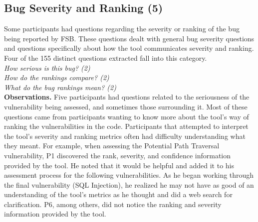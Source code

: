 \documentclass[conference]{IEEEtran}
\begin{document}




\noindent\subsection{\textbf{Bug Severity and Ranking (5)}}\label{bsr}

Some participants had questions regarding the severity or ranking of the bug being reported by FSB. 
These questions dealt with general bug severity questions and questions specifically about how the tool communicates severity and ranking. 
Four of the 155 distinct questions extracted fall into this category. 
\\

\noindent\emph{How serious is this bug? (2)} \\
\emph{How do the rankings compare? (2)} \\
\emph{What do the bug rankings mean? (2)} \\

\noindent\textbf{Observations.}
Five participants had questions related to the seriousness of the vulnerability being assessed, and sometimes those surrounding it. 
Most of these questions came from participants wanting to know more about the tool's way of ranking the vulnerabilities in the code.
Participants that attempted to interpret the tool's severity and ranking metrics often had difficulty understanding what they meant. 
For example, when assessing the Potential Path Traversal vulnerability, P1 discovered the rank, severity, and confidence information provided by the tool. 
He noted that it would be helpful and added it to his assessment process for the following vulnerabilities.
As he began working through the final vulnerability (SQL Injection), he realized he may not have as good of an understanding of the tool's metrics as he thought and did a web search for clarification. 
P6, among others, did not notice the ranking and severity information provided by the tool. 
\\
\end{document}
